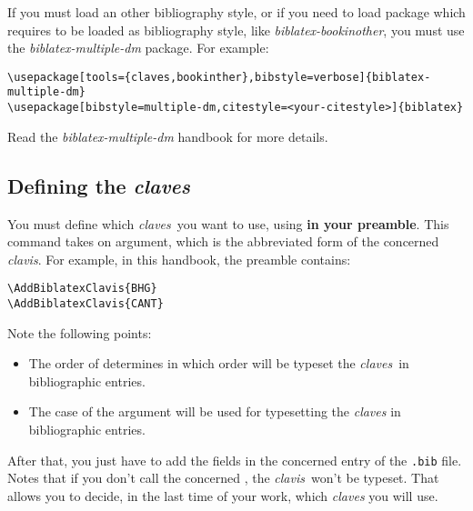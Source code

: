 \documentclass{ltxdockit}[2011/03/25]
\newcommand{\claves}{\emph{claves}\xspace}
\newcommand{\clavis}{\emph{clavis}\xspace}
\begin{document}
If you must load an other bibliography style, or if you need to load package which requires to be loaded as bibliography style, like \emph{biblatex-bookinother}, you must use the \emph{biblatex-multiple-dm} package.
 For example:
\begin{verbatim}
\usepackage[tools={claves,bookinther},bibstyle=verbose]{biblatex-multiple-dm}
\usepackage[bibstyle=multiple-dm,citestyle=<your-citestyle>]{biblatex}
\end{verbatim}

Read the \emph{biblatex-multiple-dm} handbook for more details.

\subsection{Defining the \claves}

You must define which \claves\  you want to use, using  \textbf{in your preamble}. 
This command takes on argument, which is the abbreviated form of the concerned \clavis.
 For example, in this handbook, the preamble contains:
\begin{verbatim}
\AddBiblatexClavis{BHG}
\AddBiblatexClavis{CANT}
\end{verbatim}
Note the following points:
\begin{itemize}
  \item The order of  determines in which order will be typeset the \claves\ in bibliographic entries.
 \item The case of the argument will be used for typesetting the \claves in bibliographic entries.
\end{itemize}
 
After that, you just have to add the fields in the concerned entry of the \verb+.bib+ file.
Notes that if you don't call the concerned , the \clavis\  won't be typeset.
 That allows you to decide, in the last time of your work, which \claves you will use.
\end{document}
